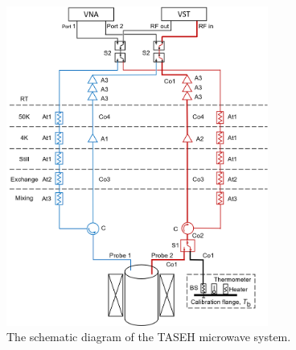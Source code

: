\documentclass[%
 reprint,prl, %
superscriptaddress,
 amsmath,amssymb,
 aps,
]{revtex4-2}
\begin{document}
\begin{figure} 
  \centering
  \includegraphics[width=8.6cm]{figures/CD102_wiring.png}
  \caption{The schematic diagram of the TASEH microwave system.}
  \label{fig:TASEH}
\end{figure}


\end{document}
